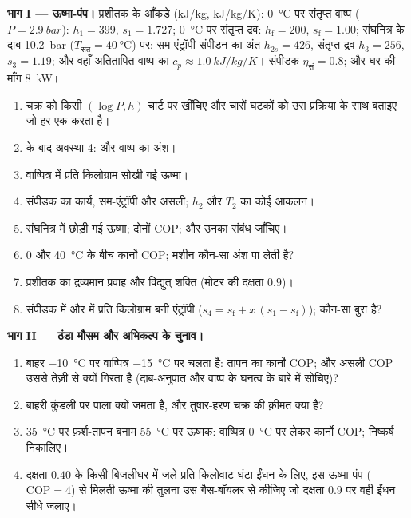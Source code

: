 \begin{problem}[{सप्ताहांत समस्या --- खुले-तंत्र संतुलनों से नापी गई
दो मशीनें}]\label{pb:b2:open-systems:1}
\textbf{भाग I --- ऊष्मा-पंप।}
प्रशीतक के आँकड़े (\unit{kJ/kg}, \unit{kJ/kg/K}): \qty{0}{\celsius} पर
संतृप्त वाष्प ($P = \qty{2.9}{bar}$): $h_1 = 399$, $s_1 = 1.727$;
\qty{0}{\celsius} पर संतृप्त द्रव: $h_{\text{f}} = 200$, $s_{\text{f}} = 1.00$;
संघनित्र के दाब \qty{10.2}{bar} ($T_{\text{संत}} = \qty{40}{\celsius}$) पर:
सम-एंट्रॉपी संपीडन का अंत $h_{2s} = 426$, संतृप्त द्रव $h_3 = 256$,
$s_3 = 1.19$; और वहाँ अतितापित वाष्प का $c_p \approx \qty{1.0}{kJ/kg/K}$।
संपीडक $\eta_{\text{सं}} = 0.8$; और घर की माँग \qty{8}{kW}।
\begin{enumerate}
  \item चक्र को किसी $(\log P, h)$ चार्ट पर खींचिए और चारों
        घटकों को उस प्रक्रिया के साथ बताइए जो हर एक करता है।
  \item {} के बाद अवस्था 4:  और वाष्प का अंश।
  \item वाष्पित्र में प्रति किलोग्राम सोखी गई ऊष्मा।
  \item संपीडक का कार्य, सम-एंट्रॉपी और असली; $h_2$ और
        $T_2$ का कोई आकलन।
  \item संघनित्र में छोड़ी गई ऊष्मा; दोनों COP; और उनका
        संबंध जाँचिए।
  \item \qty{0}{} और \qty{40}{\celsius} के बीच कार्नो COP; मशीन कौन-सा
        अंश पा लेती है?
  \item प्रशीतक का द्रव्यमान प्रवाह और विद्युत् शक्ति (मोटर की
        दक्षता $0.9$)।
  \item संपीडक में और  में प्रति किलोग्राम बनी एंट्रॉपी
        ($s_4 = s_{\text{f}} + x\,(s_1 - s_{\text{f}})$); कौन-सा
        बुरा है?
\end{enumerate}

\textbf{भाग II --- ठंडा मौसम और अभिकल्प के चुनाव।}
\begin{enumerate}[resume]
  \item बाहर \qty{-10}{\celsius} पर वाष्पित्र
        \qty{-15}{\celsius} पर चलता है: तापन का कार्नो COP; और असली
        COP उससे तेज़ी से क्यों गिरता है (दाब-अनुपात और
        वाष्प के घनत्व के बारे में सोचिए)?
  \item बाहरी कुंडली पर पाला क्यों जमता है, और तुषार-हरण चक्र की
        क़ीमत क्या है?
  \item \qty{35}{\celsius} पर फ़र्श-तापन बनाम \qty{55}{\celsius} पर
        ऊष्मक: वाष्पित्र \qty{0}{\celsius} पर लेकर कार्नो COP;
        निष्कर्ष निकालिए।
  \item दक्षता $0.40$ के किसी बिजलीघर में जले प्रति किलोवाट-घंटा ईंधन के लिए,
        इस ऊष्मा-पंप ($\mathrm{COP}
        = 4$) से मिलती ऊष्मा की तुलना
        उस गैस-बॉयलर से कीजिए जो दक्षता $0.9$ पर वही ईंधन सीधे
        जलाए।
\end{enumerate}


\end{problem}
